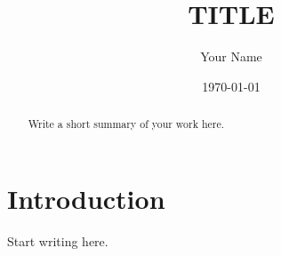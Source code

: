 \documentclass[11pt]{article}
\title{{{TITLE}}}
\author{Your Name}
\date{\today}
\begin{document}
\maketitle

\begin{abstract}
Write a short summary of your work here.
\end{abstract}

\section{Introduction}
Start writing here.
\end{document}
